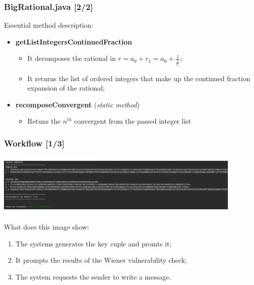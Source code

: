 \documentclass{beamer}
\begin{document}
    \begin{frame}
  \frametitle{BigRational.java [2/2]}
    Essential method description:
   
   \begin{itemize}
   \item \textbf{getListIntegersContinuedFraction}
   \begin{itemize}
   		\item It decomposes the rational in $r = a_0 + r_1 = a_0 + \frac{1}{\frac{1}{r_1}}$;
   		\item It returns the list of ordered integers that make up the continued fraction expansion of the rational;
   \end{itemize}
   \item \textbf{recomposeConvergent} (\textit{static method})
   \begin{itemize}
   \item Retuns the ${n}^{th}$ convergent from  the passed integer list
   \end{itemize}
   \end{itemize}
    
  \end{frame}
  
  \begin{frame}
  
  \frametitle{Workflow [1/3]}
  
  \includegraphics[height=3cm, width=12cm]{img/img_chiavi_generate}
  
  What does this image show:
 	\begin{enumerate}
 	\item The systems generates the key cuple and promts it;
 	\item It prompts the results of the Wiener vulnerability check;
 	\item The system requests the sender to write a message.
 	\end{enumerate}
 
  \end{frame}
  
\end{document}
